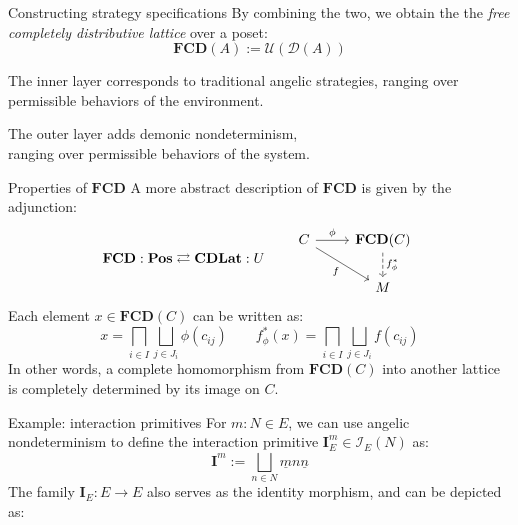 \documentclass[aspectratio=54]{beamer}
\begin{document}
%
%

\begin{frame}[fragile]{Constructing strategy specifications} %
By combining the two,
we obtain the
the \emph{free completely distributive lattice} over a poset:
\[
  \mathbf{FCD}(A) := \mathcal{U}(\mathcal{D}(A))
\]

The inner layer corresponds to traditional angelic strategies,
ranging over permissible behaviors of the environment.

The outer layer adds demonic nondeterminism, \\
ranging over permissible behaviors of the system.
\end{frame}

\begin{frame}[fragile]{Properties of $\mathbf{FCD}$} %
A more abstract description of $\mathbf{FCD}$
is given by the adjunction:
\[
  \mathbf{FCD} : \mathbf{Pos} \rightleftarrows \mathbf{CDLat} : U
  \qquad
  \begin{tikzcd}
    C \arrow[r, "\phi"] \arrow[rd, "f"'] &
    \mathbf{FCD}(C) \arrow[d, "f^*_\phi", dashed] \\ & M
  \end{tikzcd}
\]
Each element $x \in \mathbf{FCD}(C)$ can be written as:
\[
  x = \bigsqcap_{i \in I} \bigsqcup_{j \in J_i} \phi(c_{ij})
  \qquad
  f^*_\phi(x) = \bigsqcap_{i \in I} \bigsqcup_{j \in J_i} f(c_{ij})
\]
In other words,
a complete homomorphism from $\mathbf{FCD}(C)$ into another lattice
is completely determined by its image on $C$.
\end{frame}

\begin{frame}{Example: interaction primitives} %
For $m : N \in E$,
we can use angelic nondeterminism to define
the interaction primitive $\mathbf{I}_E^m \in \mathcal{I}_E(N)$
as:
\[
  \mathbf{I}^m := \bigsqcup_{n \in N} \underline{m} n \underline{n}
\]
The family $\mathbf{I}_E : E \rightarrow E$
also serves as the identity morphism,
and can be depicted as:
\[
\]
\end{frame}
\end{document}

